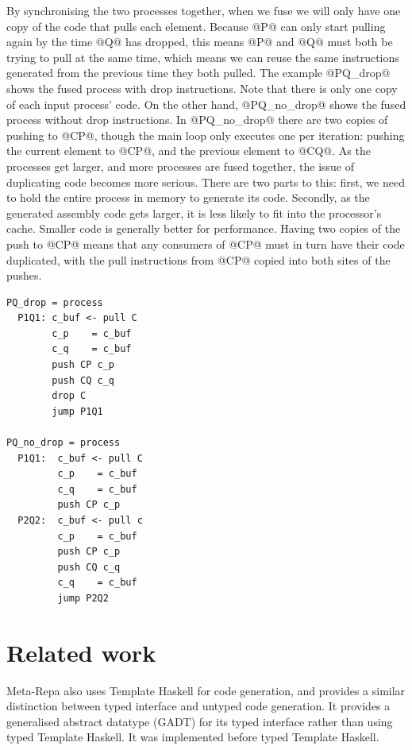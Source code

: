 By synchronising the two processes together, when we fuse we will only have one copy of the code that pulls each element.
Because @P@ can only start pulling again by the time @Q@ has dropped, this means @P@ and @Q@ must both be trying to pull at the same time, which means we can reuse the same instructions generated from the previous time they both pulled.
The example @PQ_drop@ shows the fused process with drop instructions.
Note that there is only one copy of each input process' code.
On the other hand, @PQ_no_drop@ shows the fused process without drop instructions.
In @PQ_no_drop@ there are two copies of pushing to @CP@, though the main loop only executes one per iteration: pushing the current element to @CP@, and the previous element to @CQ@.
As the processes get larger, and more processes are fused together, the issue of duplicating code becomes more serious.
There are two parts to this: first, we need to hold the entire process in memory to generate its code.
Secondly, as the generated assembly code gets larger, it is less likely to fit into the processor's cache.
Smaller code is generally better for performance.
Having two copies of the push to @CP@ means that any consumers of @CP@ must in turn have their code duplicated, with the pull instructions from @CP@ copied into both sites of the pushes.

\begin{lstlisting}
PQ_drop = process
  P1Q1: c_buf <- pull C
        c_p    = c_buf
        c_q    = c_buf
        push CP c_p
        push CQ c_q
        drop C
        jump P1Q1

PQ_no_drop = process
  P1Q1:  c_buf <- pull C
         c_p    = c_buf
         c_q    = c_buf
         push CP c_p
  P2Q2:  c_buf <- pull c
         c_p    = c_buf
         push CP c_p
         push CQ c_q
         c_q    = c_buf
         jump P2Q2
\end{lstlisting}


\section{Related work}
Meta-Repa \cite{ankner2013edsl} also uses Template Haskell for code generation, and provides a similar distinction between typed interface and untyped code generation.
It provides a generalised abstract datatype (GADT) for its typed interface rather than using typed Template Haskell.
It was implemented before typed Template Haskell.


